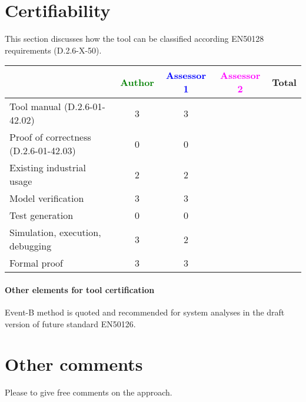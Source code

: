 \section{Certifiability}

This section discusses how the tool can be classified according EN50128 requirements (D.2.6-X-50).


\begin{tabular}{|l | c | c | c | c|}
\hline
& \textcolor{green}{Author} & \textcolor{blue}{Assessor 1} & \textcolor{magenta}{Assessor 2} & Total \\
\hline 
Tool manual (D.2.6-01-42.02) & 3 & 3 & &  \\
\hline
Proof of correctness (D.2.6-01-42.03)   & 0 & 0 & & \\
\hline
Existing industrial  usage  & 2 & 2 & & \\
\hline
Model verification & 3 & 3 & & \\
\hline
Test generation & 0 & 0 & & \\
\hline
Simulation, execution, debugging & 3 & 2 & & \\
\hline
Formal proof &3  & 3 & & \\
\hline
\end{tabular}

\paragraph{Other elements for tool certification}

\begin{author_comment}
Event-B method is quoted and recommended for system analyses in the draft version of future standard EN50126.

\end{author_comment}

\section{Other comments}
Please to  give free comments on the approach.



